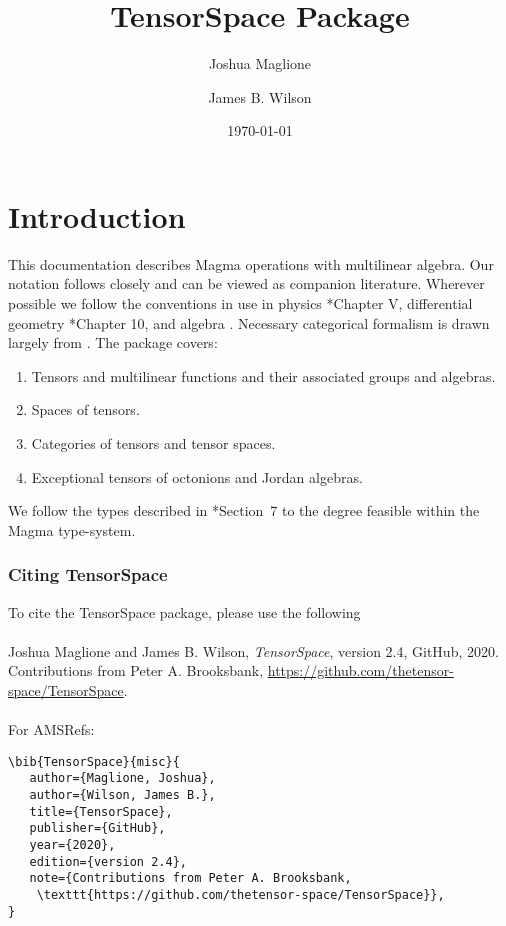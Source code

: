 \documentclass{documentation}
\title{TensorSpace Package}
\author{Joshua Maglione}
\author{James B. Wilson}
\date{\today}
\begin{document}
\frontmatter

\dominitoc
\maketitle
\tableofcontents

\mainmatter

\chapter{Introduction}

This documentation describes Magma operations with multilinear algebra. Our
notation follows \cite{FMW:densors} closely and can be viewed as companion
literature. Wherever possible we follow the conventions in use in physics
\cite{Weyl}*{Chapter V}, differential geometry \cite{Lee:geom}*{Chapter 10}, and
algebra \cite{Landsberg:tensors}. Necessary categorical formalism is drawn
largely from \cite{Wilson:division}. The package covers:
\begin{enumerate}
\item Tensors and multilinear functions and their associated groups and algebras.
\item Spaces of tensors.
\item Categories of tensors and tensor spaces.
\item Exceptional tensors of octonions and Jordan algebras.
\end{enumerate}
We follow the types described in \cite{FMW:densors}*{Section~7} to the degree
feasible within the Magma type-system.
\bigskip

\subsection*{Citing TensorSpace} 
To cite the TensorSpace package, please use the following\\
\\
Joshua Maglione and James B. Wilson, \emph{TensorSpace}, version 2.4, GitHub,
2020. Contributions from Peter A. Brooksbank,
\url{https://github.com/thetensor-space/TensorSpace}. \\
\\
For AMSRefs:
\begin{verbatim}
\bib{TensorSpace}{misc}{
   author={Maglione, Joshua},
   author={Wilson, James B.},
   title={TensorSpace},
   publisher={GitHub},
   year={2020},
   edition={version 2.4},
   note={Contributions from Peter A. Brooksbank, 
    \texttt{https://github.com/thetensor-space/TensorSpace}},
}
\end{verbatim}
\end{document}
